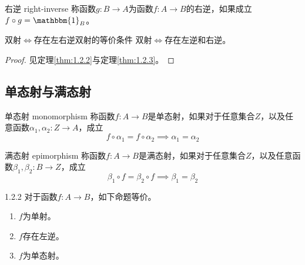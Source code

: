 \begin{definition}{右逆 right-inverse}
	称函数$g:B\to A$为函数$f:A\to B$的右逆，如果成立$f\circ g=\mathbbm{1}_B$。
\end{definition}

\begin{proposition}{双射$\iff$存在左右逆}{双射的等价条件}
	双射$\iff$存在左逆和右逆。
\end{proposition}

\begin{proof}
	见定理\ref{thm:1.2.2}与定理\ref{thm:1.2.3}。
\end{proof}

\subsection{单态射与满态射}

\begin{definition}{单态射 monomorphism}
	称函数$f:A\to B$是单态射，如果对于任意集合$Z$，以及任意函数$\alpha_1,\alpha_2:Z\to A$，成立
	$$
	f\circ \alpha_1=f\circ \alpha_2\implies\alpha_1=\alpha_2
	$$
\end{definition}

\begin{definition}{满态射 epimorphism}
	称函数$f:A\to B$是满态射，如果对于任意集合$Z$，以及任意函数$\beta_1,\beta_2:B\to Z$，成立
	$$
	\beta_1\circ f=\beta_2\circ f\implies \beta_1=\beta_2
	$$
\end{definition}

\begin{theorem}{}{1.2.2}
	对于函数$f:A\to B$，如下命题等价。
	\begin{enumerate}
		\item $f$为单射。
		\item $f$存在左逆。
		\item $f$为单态射。
	\end{enumerate}
\end{theorem}


